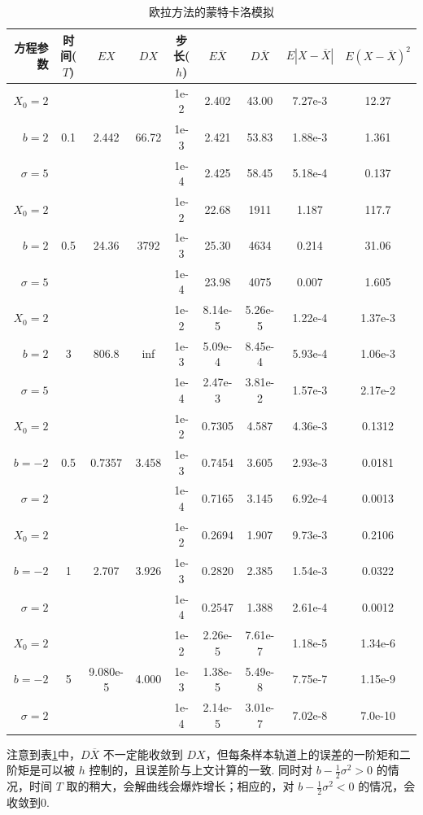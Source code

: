 \begin{table}[!htbp]
\centering
\begin{tabular}{r|c|c|c|c|c|c|c|c}
	方程参数 & 时间($T$) & $EX$ & $DX$& 步长($h$) & $E\overline X$ & $D\overline X$&$ E|X-\overline X| $   & $E(X-\overline X)^2$  \\
	\hline
	$X_0=2$&&&&             1e-2&2.402&43.00&7.27e-3&12.27 \\
	$b=2$&0.1&2.442&66.72&  1e-3&2.421&53.83&1.88e-3&1.361 \\
	$\sigma=5$&&&&          1e-4&2.425&58.45&5.18e-4&0.137 \\
	\hline
	$X_0=2$&&&&             1e-2&22.68&1911&1.187&117.7 \\
	$b=2$&0.5&24.36&3792&   1e-3&25.30&4634&0.214&31.06 \\
	$\sigma=5$&&&&          1e-4&23.98&4075&0.007&1.605 \\
	\hline
	$X_0=2$&&&&             1e-2&8.14e-5&5.26e-5&1.22e-4&1.37e-3 \\
	$b=2$&3&806.8&inf&      1e-3&5.09e-4&8.45e-4&5.93e-4&1.06e-3 \\
	$\sigma=5$&&&&          1e-4&2.47e-3&3.81e-2&1.57e-3&2.17e-2 \\
	\hline
	$X_0=2$&&&&             1e-2&0.7305&4.587&4.36e-3&0.1312\\
	$b=-2$&0.5&0.7357&3.458&1e-3&0.7454&3.605&2.93e-3&0.0181\\
	$\sigma=2$&&&&          1e-4&0.7165&3.145&6.92e-4&0.0013\\
	\hline
	$X_0=2$&&&&             1e-2&0.2694&1.907&9.73e-3&0.2106\\
	$b=-2$&1&2.707&3.926&   1e-3&0.2820&2.385&1.54e-3&0.0322\\
	$\sigma=2$&&&&          1e-4&0.2547&1.388&2.61e-4&0.0012\\
	\hline
	$X_0=2$&&&&             1e-2&2.26e-5&7.61e-7&1.18e-5&1.34e-6\\
	$b=-2$&5&9.080e-5&4.000&1e-3&1.38e-5&5.49e-8&7.75e-7&1.15e-9\\
	$\sigma=2$&&&&          1e-4&2.14e-5&3.01e-7&7.02e-8&7.0e-10\\
\end{tabular}
\vspace{.2cm}
\caption{欧拉方法的蒙特卡洛模拟} 
\label{tab_1}
\end{table}
注意到表\ref{tab_1}中，$D\overline{X}$ 不一定能收敛到 $DX$，但每条样本轨道上的误差的一阶矩和二阶矩是可以被 $h$ 控制的，且误差阶与上文计算的一致. 同时对 $b-\frac12 \sigma^2>0$ 的情况，时间 $T$ 取的稍大，会解曲线会爆炸增长；相应的，对 $b-\frac12 \sigma^2<0$ 的情况，会收敛到0. 

